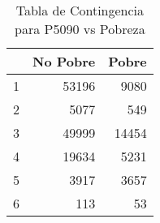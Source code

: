 \begin{table}[ht]
\centering
\begin{tabular}{rrr}
  \toprule
 & No Pobre & Pobre \\ 
  \midrule
1 & 53196 & 9080 \\ 
  2 & 5077 & 549 \\ 
  3 & 49999 & 14454 \\ 
  4 & 19634 & 5231 \\ 
  5 & 3917 & 3657 \\ 
  6 & 113 &  53 \\ 
   \bottomrule
\end{tabular}
\caption{Tabla de Contingencia para P5090 vs Pobreza} 
\label{tab:contingency_P5090}
\end{table}
